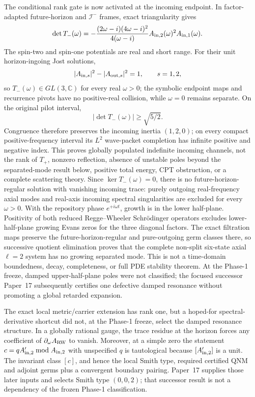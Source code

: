 \documentclass[11pt]{article}
\begin{document}
The conditional rank gate is now activated at the incoming endpoint.  In
factor-adapted future-horizon and \(\mathscr I^-\) frames, exact triangularity
gives
\[
 \det T_-(\omega)=
 -\frac{(2\omega-i)(4\omega-i)^2}{4(\omega-i)}
 A_{{\rm in},2}(\omega)^2A_{{\rm in},1}(\omega).
\]
The spin-two and spin-one potentials are real and short range.  For their
unit horizon-ingoing Jost solutions,
\[
 |A_{{\rm in},s}|^2-|A_{{\rm out},s}|^2=1,
 \qquad s=1,2,
\]
so \(T_-(\omega)\in GL(3,\mathbb C)\) for every real \(\omega>0\);
the symbolic endpoint maps and recurrence pivots have no positive-real
collision, while \(\omega=0\) remains separate.  On the original pilot
interval,
\[
 |\det T_-(\omega)|\geq\sqrt{5/2}.
\]
Congruence therefore preserves the incoming inertia \((1,2,0)\); on every
compact positive-frequency interval its \(L^2\) wave-packet completion has
infinite positive and negative index.  This proves globally populated indefinite incoming
channels, not the rank of \(T_+\), nonzero reflection, absence of unstable
poles beyond the separated-mode result below, positive total energy, CPT
obstruction, or a complete scattering theory.
Since \(\ker T_-(\omega)=0\), there is no future-horizon-regular solution
with vanishing incoming trace: purely outgoing real-frequency axial modes
and real-axis incoming spectral singularities are excluded for every
\(\omega>0\).  With the repository phase \(e^{+i\omega t}\), growth is in
the lower half-plane.  Positivity of both reduced Regge--Wheeler
Schr\"odinger operators excludes lower-half-plane growing Evans zeros for
the three diagonal factors.  The exact filtration maps preserve the
future-horizon-regular and pure-outgoing germ classes there, so successive
quotient elimination proves that the complete non-split six-state axial
\(\ell=2\) system has no growing separated mode.  This is not a time-domain
boundedness, decay, completeness, or full PDE stability theorem.  At the
Phase-1 freeze, damped upper-half-plane poles were not classified; the
focused successor Paper~17 subsequently certifies one defective damped
resonance without promoting a global retarded expansion.

The exact local metric/carrier extension has rank one, but a hoped-for
spectral-derivative shortcut did not, at the Phase-1 freeze, select the
damped resonance structure.  In a globally rational gauge, the trace residue at the horizon
forces any coefficient of \(\partial_\omega A_{\rm RW}\) to vanish.
Moreover, at a simple zero the statement
\(c=qA_{{\rm in},2}'\bmod A_{{\rm in},2}\) with unspecified \(q\) is
tautological because \([A_{{\rm in},2}']\) is a unit.  The invariant class
\([c]\), and hence the local Smith type, required certified QNM and adjoint
germs plus a convergent boundary pairing.  Paper~17 supplies those later
inputs and selects Smith type \((0,0,2)\); that successor result is not a
dependency of the frozen Phase-1 classification.
\end{document}
